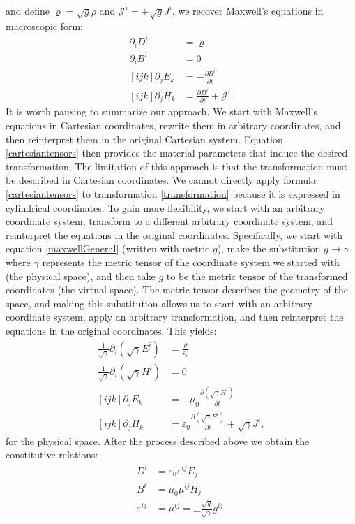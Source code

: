 and define \(\varrho=\sqrt{g}\rho\) and \(\mathcal{J}^i=\pm\sqrt{g}J^i\), we
recover Maxwell's equations in macroscopic form:
\begin{align*}
\partial_i D^i&=\varrho\\
\partial_i B^i&=0\\
[ijk]\partial_jE_k&=-\frac{\partial B^i}{\partial t}\\
[ijk]\partial_jH_k&=\frac{\partial D^i}{\partial t}+\mathcal{J}^i.
\end{align*}
It is worth pausing to summarize our approach. We start with
Maxwell's equations in Cartesian coordinates, rewrite them in arbitrary coordinates,
and then reinterpret them in the original Cartesian system. Equation
\eqref{cartesiantensors} then provides the material parameters that induce the
desired transformation. The limitation of this approach is that the
transformation must be described in Cartesian coordinates. We cannot directly apply
formula \eqref{cartesiantensors} to transformation \eqref{transformation}
because it is expressed in cylindrical coordinates. To gain more flexibility, we start
with an arbitrary coordinate system, transform to a different arbitrary coordinate
system, and reinterpret the equations in the original coordinates. Specifically, we start with equation \eqref{maxwellGeneral} (written with metric \(g\)), make the substitution \(g\to\gamma\) where \(\gamma\) represents the metric tensor of the coordinate system we started with (the physical space), and then take \(g\) to be the metric tensor of the transformed coordinates (the virtual space). The metric tensor describes the geometry of the space, and making this substitution allows us to start with an arbitrary coordinate system, apply an arbitrary transformation, and then reinterpret the equations in the original coordinates. This yields:
\begin{align*}
\frac{1}{\sqrt{\gamma}}\partial_i\left(\sqrt{\gamma}E^i\right) &= \frac{\rho}{\varepsilon_0}\\
\frac{1}{\sqrt{\gamma}}\partial_i\left(\sqrt{\gamma}H^i\right) &=0\\
[ijk] \partial_jE_k &= -\mu_0\frac{\partial \left(\sqrt{\gamma} H^i\right)}{\partial t}\\
[ijk] \partial_jH_k &= \varepsilon_0\frac{\partial \left(\sqrt{\gamma} E^i\right)}{\partial t} + \sqrt{\gamma}J^i,
\end{align*}
for the physical space. After the process described above
we obtain the constitutive relations:
\begin{align}
	D^i&=\varepsilon_0\varepsilon^{ij}E_j\nonumber\\
	B^i&=\mu_0\mu^{ij}H_j\nonumber\\
	\varepsilon^{ij}&=\mu^{ij}=\pm\frac{\sqrt{g}}{\sqrt{\gamma}}g^{ij}\label{tensorformulawithg}.
\end{align}
